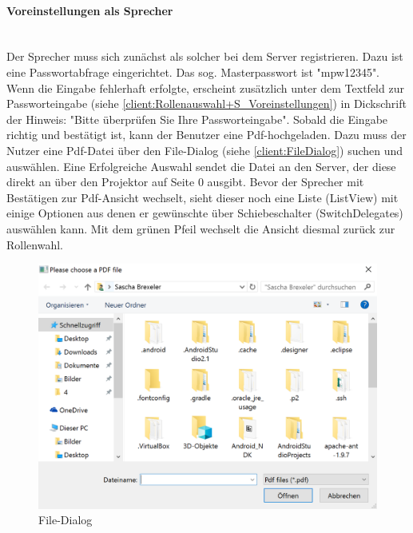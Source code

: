 \paragraph{Voreinstellungen als Sprecher}$\;$\\
Der Sprecher muss sich zunächst als solcher bei dem Server registrieren. Dazu ist eine Passwortabfrage eingerichtet. Das sog. Masterpasswort ist "mpw12345". Wenn die Eingabe fehlerhaft erfolgte, erscheint zusätzlich unter dem Textfeld zur Passworteingabe (siehe \autoref{client:Rollenauswahl+S_Voreinstellungen}) in Dickschrift der Hinweis: "Bitte überprüfen Sie Ihre Passworteingabe". Sobald die Eingabe richtig und bestätigt ist, kann der Benutzer eine Pdf-hochgeladen. Dazu muss der Nutzer eine Pdf-Datei über den File-Dialog (siehe \autoref{client:FileDialog}) suchen und auswählen. Eine Erfolgreiche Auswahl sendet die Datei an den Server, der diese direkt an über den Projektor auf Seite 0 ausgibt. Bevor der Sprecher mit Bestätigen zur Pdf-Ansicht wechselt, sieht dieser noch eine Liste (ListView) mit einige Optionen aus denen er gewünschte über Schiebeschalter (SwitchDelegates) auswählen kann. Mit dem grünen Pfeil wechselt die Ansicht diesmal zurück zur Rollenwahl.

\begin{figure}[ht!]
	\centering
	\includegraphics[scale=0.7]{GUI/Bilder/3_S_4_Voreinstellung.PNG}
	\caption{File-Dialog{\tiny}}
	\label{client:FileDialog}
\end{figure}


